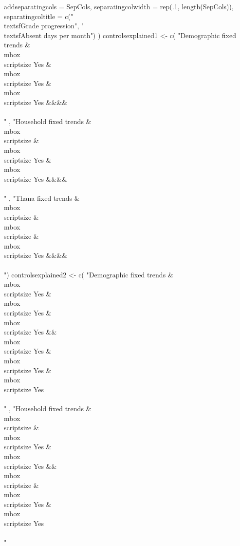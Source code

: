\begin{Schunk}
\begin{Sinput}
    addseparatingcols = SepCols, separatingcolwidth = rep(.1, length(SepCols)), 
    separatingcoltitle = c("\\textsf{Grade progression}", "\\textsf{Absent days per month}")
  ) 
controlsexplained1 <- c(
  "Demographic fixed trends & \\mbox{\\scriptsize Yes} & \\mbox{\\scriptsize Yes} & \\mbox{\\scriptsize Yes} &&&&\\\\"
    , 
    "Household fixed trends & \\mbox{\\scriptsize } & \\mbox{\\scriptsize Yes} & \\mbox{\\scriptsize Yes} &&&& \\\\"
    , 
    "Thana fixed trends & \\mbox{\\scriptsize } & \\mbox{\\scriptsize } & \\mbox{\\scriptsize Yes} &&&&\\\\[1.5ex]")
controlsexplained2 <- c(
  "Demographic fixed trends & \\mbox{\\scriptsize Yes} & \\mbox{\\scriptsize Yes} & \\mbox{\\scriptsize Yes} && \\mbox{\\scriptsize Yes} & \\mbox{\\scriptsize Yes} & \\mbox{\\scriptsize Yes}\\\\"
    , 
    "Household fixed trends & \\mbox{\\scriptsize } & \\mbox{\\scriptsize Yes} & \\mbox{\\scriptsize Yes} && \\mbox{\\scriptsize } & \\mbox{\\scriptsize Yes} & \\mbox{\\scriptsize Yes} \\\\"

\end{Sinput}
\end{Schunk}
